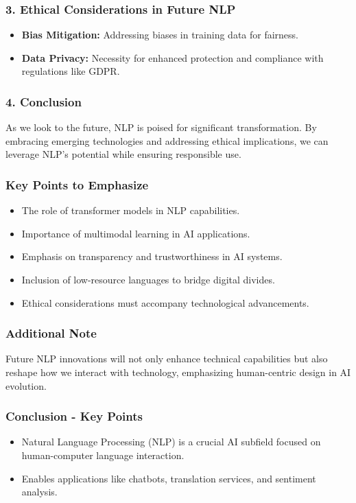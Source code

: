 \documentclass[aspectratio=169]{beamer}
\begin{document}
\begin{frame}[fragile]
    \frametitle{3. Ethical Considerations in Future NLP}
    \begin{itemize}
        \item \textbf{Bias Mitigation:} Addressing biases in training data for fairness.
        \item \textbf{Data Privacy:} Necessity for enhanced protection and compliance with regulations like GDPR.
    \end{itemize}
\end{frame}

\begin{frame}[fragile]
    \frametitle{4. Conclusion}
    As we look to the future, NLP is poised for significant transformation. 
    By embracing emerging technologies and addressing ethical implications, we can leverage NLP's potential while ensuring responsible use.
\end{frame}

\begin{frame}[fragile]
    \frametitle{Key Points to Emphasize}
    \begin{itemize}
        \item The role of transformer models in NLP capabilities.
        \item Importance of multimodal learning in AI applications.
        \item Emphasis on transparency and trustworthiness in AI systems.
        \item Inclusion of low-resource languages to bridge digital divides.
        \item Ethical considerations must accompany technological advancements.
    \end{itemize}
\end{frame}

\begin{frame}[fragile]
    \frametitle{Additional Note}
    Future NLP innovations will not only enhance technical capabilities but also reshape how we interact with technology, emphasizing human-centric design in AI evolution.
\end{frame}

\begin{frame}[fragile]
    \frametitle{Conclusion - Key Points}
    \begin{itemize}
        \item Natural Language Processing (NLP) is a crucial AI subfield focused on human-computer language interaction.
        \item Enables applications like chatbots, translation services, and sentiment analysis.
    \end{itemize}
\end{frame}
\end{document}
